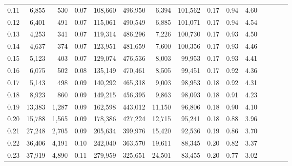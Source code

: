 \begin{tabular}{rrrcrrrrrrrrrrr}
0.11 &   6,855 &    530 &                                       0.07 &  108,660 &  496,950 &    6,394 &  101,562 &  0.17 &  0.94 &                         4.60 \\
0.12 &   6,401 &    491 &                                       0.07 &  115,061 &  490,549 &    6,885 &  101,071 &  0.17 &  0.94 &                         4.54 \\
0.13 &   4,253 &    341 &                                       0.07 &  119,314 &  486,296 &    7,226 &  100,730 &  0.17 &  0.93 &                         4.50 \\
0.14 &   4,637 &    374 &                                       0.07 &  123,951 &  481,659 &    7,600 &  100,356 &  0.17 &  0.93 &                         4.46 \\
0.15 &   5,123 &    403 &                                       0.07 &  129,074 &  476,536 &    8,003 &   99,953 &  0.17 &  0.93 &                         4.41 \\
0.16 &   6,075 &    502 &                                       0.08 &  135,149 &  470,461 &    8,505 &   99,451 &  0.17 &  0.92 &                         4.36 \\
0.17 &   5,143 &    498 &                                       0.09 &  140,292 &  465,318 &    9,003 &   98,953 &  0.18 &  0.92 &                         4.31 \\
0.18 &   8,923 &    860 &                                       0.09 &  149,215 &  456,395 &    9,863 &   98,093 &  0.18 &  0.91 &                         4.23 \\
0.19 &  13,383 &  1,287 &                                       0.09 &  162,598 &  443,012 &   11,150 &   96,806 &  0.18 &  0.90 &                         4.10 \\
0.20 &  15,788 &  1,565 &                                       0.09 &  178,386 &  427,224 &   12,715 &   95,241 &  0.18 &  0.88 &                         3.96 \\
0.21 &  27,248 &  2,705 &                                       0.09 &  205,634 &  399,976 &   15,420 &   92,536 &  0.19 &  0.86 &                         3.70 \\
0.22 &  36,406 &  4,191 &                                       0.10 &  242,040 &  363,570 &   19,611 &   88,345 &  0.20 &  0.82 &                         3.37 \\
0.23 &  37,919 &  4,890 &                                       0.11 &  279,959 &  325,651 &   24,501 &   83,455 &  0.20 &  0.77 &                         3.02 \\

\end{tabular}
